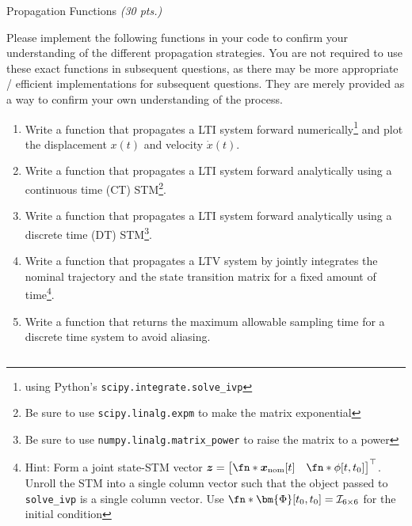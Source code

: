 \begin{hwkProblem}{1}{Propagation Functions \textit{(30 pts.)}} \label{hwk:p01}

	Please implement the following functions in your code to confirm your understanding of the different propagation strategies. You are not required to use these exact functions in subsequent questions, as there may be more appropriate / efficient implementations for subsequent questions. They are merely provided as a way to confirm your own understanding of the process.
	\begin{enumerate}[label=(\alph*)]
		\item \label{hwk:p01a} Write a function that propagates a LTI system forward numerically\footnote{using Python's \texttt{scipy.integrate.solve_ivp}} and plot the displacement \(x(t)\) and velocity \(\dot{x}(t)\).
		\item \label{hwk:p01b} Write a function that propagates a LTI system forward analytically using a continuous time (CT) STM\footnote{Be sure to use \texttt{scipy.linalg.expm} to make the matrix exponential}.
		\item \label{hwk:p01c} Write a function that propagates a LTI system forward analytically using a discrete time (DT) STM\footnote{Be sure to use \texttt{numpy.linalg.matrix_power} to raise the matrix to a power}.
		\item \label{hwk:p01d} Write a function that propagates a LTV system by jointly integrates the nominal trajectory and the state transition matrix for a fixed amount of time\footnote{Hint: Form a joint state-STM vector \(\boldsymbol{z}={\begin{bmatrix}\fn*{\boldsymbol{x}_{\text{nom}}}[t] & \fn*{\phi}[t, t_0]\end{bmatrix}}^{\top}\). Unroll the STM into a single column vector such that the object passed to \texttt{solve_ivp} is a single column vector. Use \(\fn*{\bm{\Phi}}[t_0, t_0]=\mathcal{I}_{6\times6}\) for the initial condition}.
		\item \label{hwk:p01e} Write a function that returns the maximum allowable sampling time for a discrete time system to avoid aliasing.
	\end{enumerate}

	\hwkSol{} \label{hwk:s01}

	\hwkPart{} \label{hwk:s01a}

	\inputminted{python}{./outputs/text/s01a.txt}

	\hwkPart{} \label{hwk:s01b}


\end{hwkProblem}
